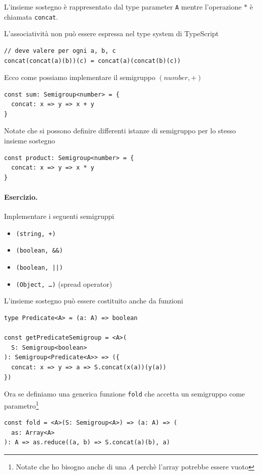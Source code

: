 \documentclass[12pt]{article}
\begin{document}
L'insieme sostegno è rappresentato dal type parameter \texttt{A} mentre l'operazione $*$ è chiamata \texttt{concat}.

L'associatività non può essere espressa nel type system di TypeScript

\begin{verbatim}
// deve valere per ogni a, b, c
concat(concat(a)(b))(c) = concat(a)(concat(b)(c))
\end{verbatim}

Ecco come possiamo implementare il semigruppo $(number, +)$

\begin{verbatim}
const sum: Semigroup<number> = {
  concat: x => y => x + y
}
\end{verbatim}

Notate che si possono definire differenti istanze di semigruppo per lo stesso insieme sostegno

\begin{verbatim}
const product: Semigroup<number> = {
  concat: x => y => x * y
}
\end{verbatim}

\paragraph{Esercizio.} Implementare i seguenti semigruppi
\begin{itemize}
  \item \texttt{(string, +)}
  \item \texttt{(boolean, \&\&)}
  \item \texttt{(boolean, ||)}
  \item \texttt{(Object, \ldots)} (spread operator)
\end{itemize}

L'insieme sostegno può essere costituito anche da funzioni

\begin{verbatim}
type Predicate<A> = (a: A) => boolean

const getPredicateSemigroup = <A>(
  S: Semigroup<boolean>
): Semigroup<Predicate<A>> => ({
  concat: x => y => a => S.concat(x(a))(y(a))
})
\end{verbatim}

Ora se definiamo una generica funzione \texttt{fold} che accetta un semigruppo come parametro\footnote{Notate che ho bisogno anche di una $A$ perchè l'array potrebbe essere vuoto}

\begin{verbatim}
const fold = <A>(S: Semigroup<A>) => (a: A) => (
  as: Array<A>
): A => as.reduce((a, b) => S.concat(a)(b), a)
\end{verbatim}
\end{document}
